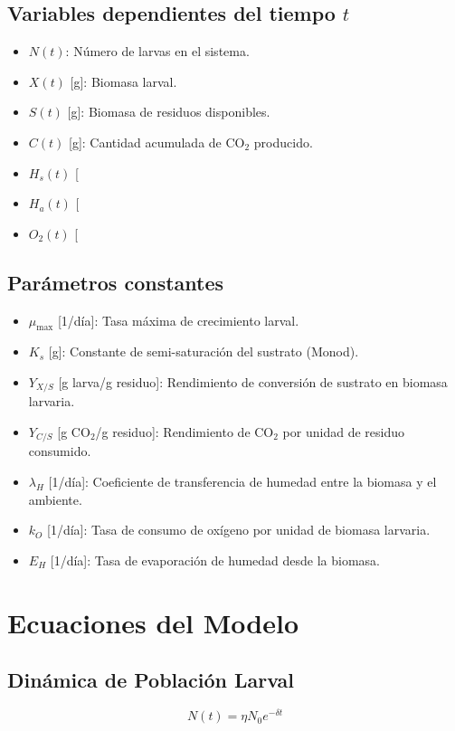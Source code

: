 \documentclass[12pt]{article}
\begin{document}
\subsection{Variables dependientes del tiempo $t$}
\begin{itemize}
    \item $N(t)$: Número de larvas en el sistema.
    \item $X(t)$ [g]: Biomasa larval.
    \item $S(t)$ [g]: Biomasa de residuos disponibles.
    \item $C(t)$ [g]: Cantidad acumulada de CO$_2$ producido.
    \item $H_s(t)$ [%
    \item $H_a(t)$ [%
    \item $O_2(t)$ [%
\end{itemize}

\subsection{Parámetros constantes}
\begin{itemize}
    \item $\mu_{\max}$ [1/día]: Tasa máxima de crecimiento larval.
    \item $K_s$ [g]: Constante de semi-saturación del sustrato (Monod).
    \item $Y_{X/S}$ [g larva/g residuo]: Rendimiento de conversión de sustrato en biomasa larvaria.
    \item $Y_{C/S}$ [g CO$_2$/g residuo]: Rendimiento de CO$_2$ por unidad de residuo consumido.
    \item $\lambda_H$ [1/día]: Coeficiente de transferencia de humedad entre la biomasa y el ambiente.
    \item $k_O$ [1/día]: Tasa de consumo de oxígeno por unidad de biomasa larvaria.
    \item $E_H$ [1/día]: Tasa de evaporación de humedad desde la biomasa.
\end{itemize}

\section{Ecuaciones del Modelo}
\subsection{Dinámica de Población Larval}
\begin{equation}
    N(t) = \eta N_0 e^{-\delta t}
\end{equation}
\end{document}
